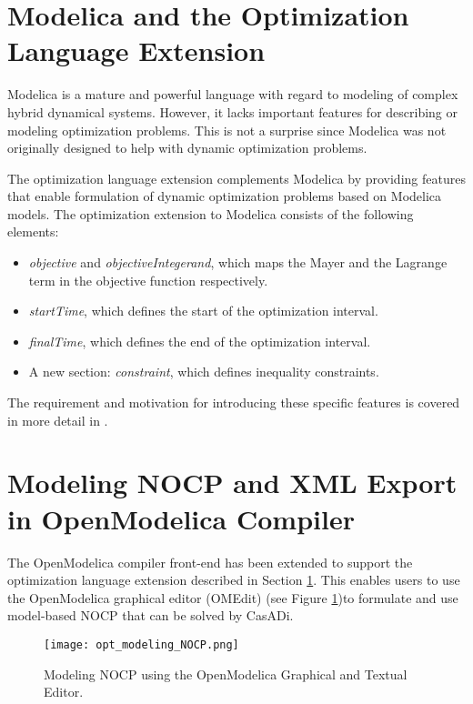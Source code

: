 \section{Modelica and the Optimization Language Extension}
\label{sec:optimizationoptimica}

Modelica is a mature and powerful language with regard to modeling of complex hybrid dynamical systems. However, it
lacks important features for describing or modeling optimization problems. This is not a surprise since Modelica
was not originally designed to help with dynamic optimization problems.

The optimization language extension \cite{optimica} complements Modelica by providing features that enable
formulation of dynamic optimization problems based on Modelica models. The optimization extension to Modelica
consists of the following elements:

\begin{itemize}
	
\item \textit{objective} and \textit{objectiveIntegerand}, which maps the Mayer and the Lagrange term in 
            the objective function respectively.
\item \textit{startTime}, which defines the start of the optimization interval.
\item \textit{finalTime}, which defines the end of the optimization interval.
\item A new section: \textit{constraint}, which defines inequality constraints.
\end{itemize}

The requirement and motivation for introducing these specific features is covered in more detail in \cite{optimica}.

\section{Modeling NOCP and XML Export in OpenModelica Compiler}
\label{sec:optimizationopenmodelica}

The OpenModelica compiler front-end has been extended to support the optimization language extension described in
Section \ref{sec:optimizationoptimica}. This enables users to use the OpenModelica graphical editor (OMEdit) (see Figure \ref{fig:nocpmodel})to formulate and use model-based NOCP that can be solved by CasADi.

\begin{figure}
	\texttt{[image: opt\_modeling\_NOCP.png]}
	\caption{Modeling NOCP using the OpenModelica Graphical and Textual Editor.}
	\label{fig:nocpmodel}
\end{figure}

